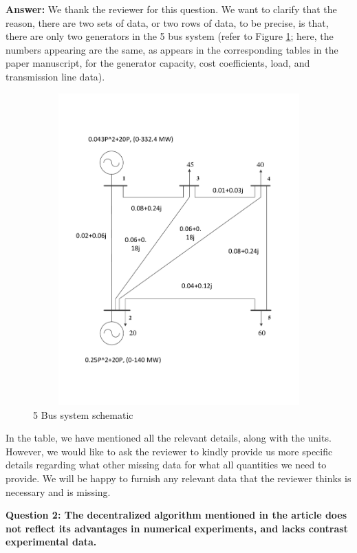 \documentclass[8pt]{article}
\begin{document}
\textbf{Answer: } We thank the reviewer for this question. We want to clarify that the reason, there are two sets of data, or two rows of data, to be precise, is that, there are only two generators in the 5 bus system (refer to Figure \ref{5Bus}; here, the numbers appearing are the same, as appears in the corresponding tables in the paper manuscript, for the generator capacity, cost coefficients, load, and transmission line data). 
\begin{figure}
\begin{center}
\includegraphics[height=12cm,width=15cm]{5_bus.pdf}
\caption{5 Bus system schematic}
\label{5Bus}
\end{center}
\end{figure}
In the table, we have mentioned all the relevant details, along with the units. However, we would like to ask the reviewer to kindly provide us more specific details regarding what other missing data for what all quantities we need to provide. We will be happy to furnish any relevant data that the reviewer thinks is necessary and is missing. 

\textbf{Question 2: The decentralized algorithm mentioned in the article does not reflect its advantages in numerical experiments, and lacks contrast experimental data.}\\
\end{document}
